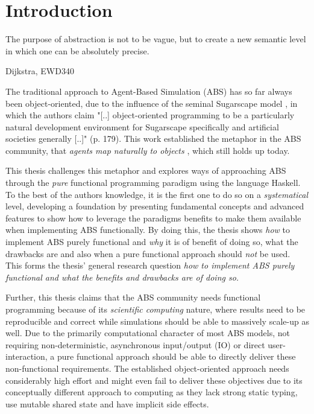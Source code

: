 \chapter{Introduction}
\epigraph{The purpose of abstraction is not to be vague, but to create a new semantic level in which one can be absolutely precise.}{Dijkstra, EWD340}
\label{ch:intro}

The traditional approach to Agent-Based Simulation (ABS) has so far always been object-oriented, due to the influence of the seminal Sugarscape model \cite{epstein_growing_1996}, in which the authors claim "[..] object-oriented programming to be a particularly natural development environment for Sugarscape specifically and artificial societies generally [..]" (p. 179). This work established the metaphor in the ABS community, that \textit{agents map naturally to objects} \cite{north_managing_2007}, which still holds up today. %

This thesis challenges this metaphor and explores ways of approaching ABS through the \textit{pure} functional programming paradigm using the language Haskell. To the best of the authors knowledge, it is the first one to do so on a \textit{systematical} level, developing a foundation by presenting fundamental concepts and advanced features to show how to leverage the paradigms benefits \cite{hudak_history_2007} to make them available when implementing ABS functionally. By doing this, the thesis shows \textit{how} to implement ABS purely functional and \textit{why} it is of benefit of doing so, what the drawbacks are and also when a pure functional approach should \textit{not} be used. This forms the thesis' general research question \textit{how to implement ABS purely functional and what the benefits and drawbacks are of doing so.} 

Further, this thesis claims that the ABS community needs functional programming because of its \textit{scientific computing} nature, where results need to be reproducible and correct while simulations should be able to massively scale-up as well. Due to the primarily computational character of most ABS models, not requiring non-deterministic, asynchronous input/output (IO) or direct user-interaction, a pure functional approach should be able to directly deliver these non-functional requirements. The established object-oriented approach needs considerably high effort and might even fail to deliver these objectives due to its conceptually different approach to computing as they lack strong static typing, use mutable shared state and have implicit side effects. 

